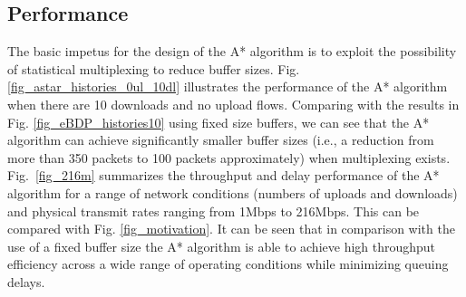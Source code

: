 \documentclass[10pt,twocolumn, journal]{IEEEtran}
\begin{document}
\subsection{Performance}\label{subsec_performance}

The basic impetus for the design of the A* algorithm is to exploit the
possibility of statistical multiplexing to reduce buffer sizes. Fig.
\ref{fig_astar_histories_0ul_10dl} illustrates the performance of the A* algorithm when there are
10 downloads and no upload flows.  Comparing with the results in Fig.
\ref{fig_eBDP_histories10} using fixed size buffers, we can see that the A* algorithm can
achieve significantly smaller buffer sizes (i.e., a reduction from more than 350 packets to 100
packets approximately) when multiplexing exists.  Fig.~\ref{fig_216m} summarizes the throughput and delay performance of the A* algorithm for a range of network conditions (numbers of uploads and downloads) and physical transmit rates ranging from  1Mbps to 216Mbps.  This can be compared with Fig. \ref{fig_motivation}.  It can be seen that in comparison with the use of a fixed buffer size the A* algorithm is able to achieve high throughput efficiency across a wide range of operating conditions while minimizing queuing delays.

\begin{figure*}[tb]
   \centering
   \caption{Throughput efficiency and maximum smoothed round trip delays (max sRTT) for the topology in Fig. \ref{fig_topo_simu} when the A* algorithm is used. Here, the AP throughput efficiency is the ratio between the throughput achieved using the A* algorithm and the maximum throughput achieved using fixed size buffers. Rates before and after the '/' are used physical layer data and basic rates. For the 216Mbps data, 8 packets are aggregated into each frame at the MAC layer to improve throughput efficiency in an 802.11n-like scheme.  The wired RTT is 200 ms.}
   \label{fig_216m}
\end{figure*}
\end{document}
